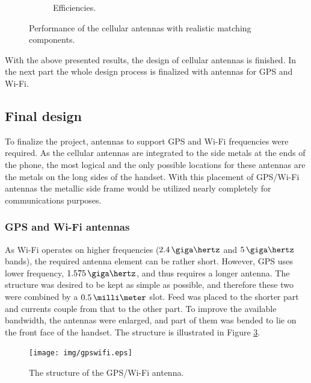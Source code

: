 \begin{figure}[H]
\begin{subfigure}[b]{0.49\textwidth}
        \caption{Efficiencies.}
        \label{fig:div_eff_real}
    \end{subfigure}
    \caption{Performance of the cellular antennas with realistic matching components.}
    \label{fig:div_real}
\end{figure}

With the above presented results, the design of cellular antennas is finished. In the next part the whole design process is finalized with antennas for GPS and Wi-Fi.

\subsection{Final design}
\label{sec:sim_final}

To finalize the project, antennas to support GPS and Wi-Fi frequencies were required. As the cellular antennas are integrated to the side metals at the ends of the phone, the most logical and the only possible locations for these antennas are the metals on the long sides of the handset. With this placement of GPS/Wi-Fi antennas the metallic side frame would be utilized nearly completely for communications purposes.


\subsubsection{GPS and Wi-Fi antennas}
\label{sec:gpswifi}
As Wi-Fi operates on higher frequencies ($2.4\,\giga\hertz$ and $5\,\giga\hertz$ bands), the required antenna element can be rather short. However, GPS uses lower frequency, $1.575\,\giga\hertz$, and thus requires a longer antenna. The structure was desired to be kept as simple as possible, and therefore these two were combined by a $0.5\,\milli\meter$ slot. Feed was placed to the shorter part and currents couple from that to the other part. To improve the available bandwidth, the antennas were enlarged, and part of them was bended to lie on the front face of the handset. The structure is illustrated in Figure \ref{fig:gps_struct}.
\begin{figure}[H]
    \centering
    \texttt{[image: img/gpswifi.eps]}
    \caption{The structure of the GPS/Wi-Fi antenna.}
    \label{fig:gps_struct}
\end{figure}

